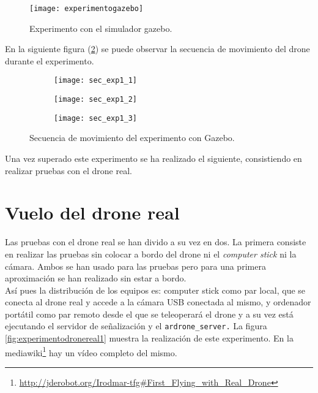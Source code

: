 \begin{figure}[h!]
\centering
\texttt{[image: experimentogazebo]}
\caption{Experimento con el simulador gazebo.}
\label{fig:experimentogazebo}
\end{figure}

En la siguiente figura (\ref{fig:secexp1}) se puede observar la secuencia de movimiento del drone durante el experimento.\\
\newpage
\begin{figure}[h!]
\centering
  \begin{subfigure}[]{47mm}
    \texttt{[image: sec\_exp1\_1]}
  \end{subfigure}
  \hspace{0.5pt}
  \begin{subfigure}[]{47mm}
    \texttt{[image: sec\_exp1\_2]}
  \end{subfigure}
    \hspace{0.5pt}
    \begin{subfigure}[]{47mm}
    \texttt{[image: sec\_exp1\_3]}
  \end{subfigure}
    \caption{Secuencia de movimiento del experimento con Gazebo.}
  \label{fig:secexp1}
\end{figure}

Una vez superado este experimento se ha realizado el siguiente, consistiendo en realizar pruebas con el drone real.\\

\section{Vuelo del drone real}

Las pruebas con el drone real se han divido a su vez en dos. La primera consiste en realizar las pruebas sin colocar a bordo del drone ni el \emph{computer stick} ni la cámara. Ambos se han usado para las pruebas pero para una primera aproximación se han realizado sin estar a bordo.\\

Así pues la distribución de los equipos es: computer stick como par local, que se conecta al drone real y accede a la cámara USB conectada al mismo, y ordenador portátil como par remoto desde el que se teleoperará el drone y a su vez está ejecutando el servidor de señalización y el \texttt{ardrone\_server.} La figura \ref{fig:experimentodronereal1} muestra la realización de este experimento. En la mediawiki\footnote{\url{http://jderobot.org/Irodmar-tfg\#First\_Flying\_with\_Real\_Drone}}\cite{Mediawiki} hay un vídeo completo del mismo.\\

